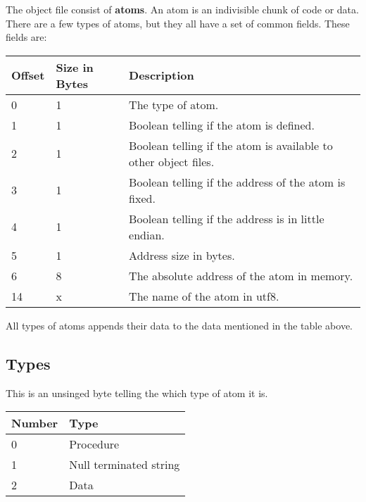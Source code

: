 The object file consist of \textbf{atoms}. An atom is an indivisible chunk of
code or data. There are a few types of atoms, but they all have a set of common
fields. These fields are:

\begin{table}[h]
    \centering
    \label{tbl:atom}
    \begin{tabular}{|l|l|l|}
        \hline
        \textbf{Offset} & \textbf{Size in Bytes} & \textbf{Description}                                            \\ \hline
        0               & 1                      & The type of atom.                                               \\ \hline
        1               & 1                      & Boolean telling if the atom is defined.                         \\ \hline
        2               & 1                      & Boolean telling if the atom is available to other object files. \\ \hline
        3               & 1                      & Boolean telling if the address of the atom is fixed.            \\ \hline
        4               & 1                      & Boolean telling if the address is in little endian.             \\ \hline
        5               & 1                      & Address size in bytes.                                          \\ \hline
        6               & 8                      & The absolute address of the atom in memory.                     \\ \hline
        14              & x                      & The name of the atom in utf8.                                   \\ \hline
    \end{tabular}
\end{table}

All types of atoms appends their data to the data mentioned in the table above.

\subsection{Types}
This is an unsinged byte telling the which type of atom it is.

\begin{table}[h]
    \centering
    \label{tbl:type}
    \begin{tabular}{|l|l|}
        \hline
        \textbf{Number} & \textbf{Type}          \\ \hline
        0               & Procedure              \\ \hline
        1               & Null terminated string \\ \hline
        2               & Data                   \\ \hline
    \end{tabular}
\end{table}

